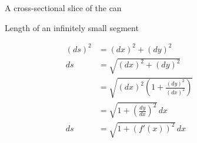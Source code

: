 \documentclass[11pt]{article}
\begin{document}
    \begin{figure}[H]
        \centering
        \begin{minipage}{.5\textwidth}
            \centering
            \vspace{-10pt}
            \caption{A cross-sectional slice of the can}
            \label{fig:can-slice}
        \end{minipage}%
        \begin{minipage}{0.5\textwidth}
            \centering
            \vspace{-10pt}
            \caption{Length of an infinitely small segment}
            \label{fig:arc-length}
        \end{minipage}
    \end{figure}
    \vspace{-10pt}

    \begin{figure}
        {\footnotesize\begin{align*}
            (ds)^2 &= (dx)^2 + (dy)^2 \\
            ds &= \sqrt{(dx)^2 + (dy)^2} \\
            &= \sqrt{(dx)^2 \left( 1 + \frac{(dy)^2}{(dx)^2} \right)} \\
            &= \sqrt{1 + \left( \frac{dy}{dx} \right)^2} \, dx \\
            ds &= \sqrt{1 + (f'(x))^2} \, dx
        \end{align*}}
    \end{figure}
\end{document}
